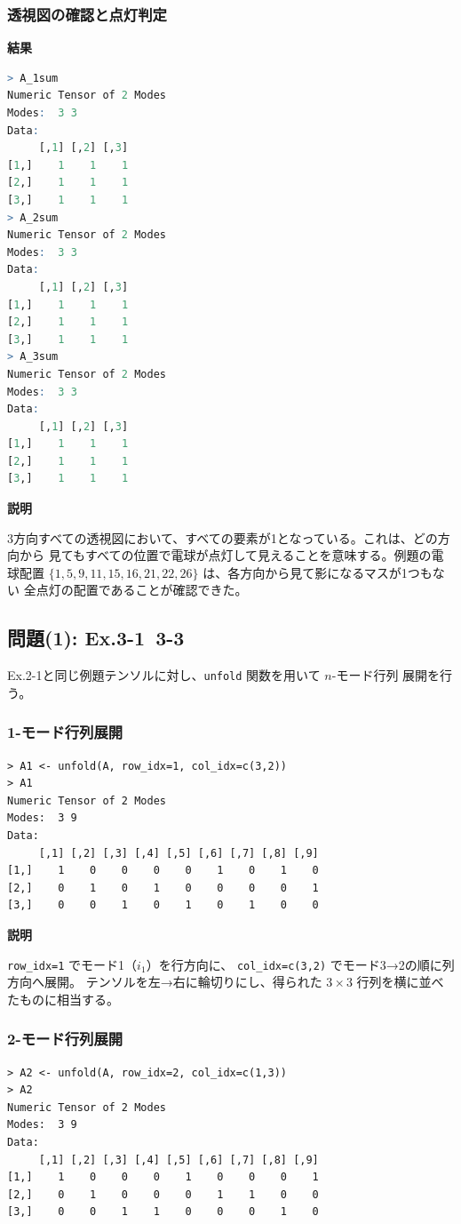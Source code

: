 \documentclass[12pt,a4paper]{ltjsarticle}
\begin{document}
\subsubsection{透視図の確認と点灯判定}

\textbf{結果}

\begin{lstlisting}[language=R]
> A_1sum
Numeric Tensor of 2 Modes
Modes:  3 3
Data:
     [,1] [,2] [,3]
[1,]    1    1    1
[2,]    1    1    1
[3,]    1    1    1
> A_2sum
Numeric Tensor of 2 Modes
Modes:  3 3
Data:
     [,1] [,2] [,3]
[1,]    1    1    1
[2,]    1    1    1
[3,]    1    1    1
> A_3sum
Numeric Tensor of 2 Modes
Modes:  3 3
Data:
     [,1] [,2] [,3]
[1,]    1    1    1
[2,]    1    1    1
[3,]    1    1    1
\end{lstlisting}

\textbf{説明}

3方向すべての透視図において、すべての要素が1となっている。これは、どの方向から
見てもすべての位置で電球が点灯して見えることを意味する。例題の電球配置
$\{1,5,9,11,15,16,21,22,26\}$ は、各方向から見て影になるマスが1つもない
全点灯の配置であることが確認できた。

\subsection{問題(1): Ex.3-1~3-3}\label{subsec:exercise3}

Ex.2-1と同じ例題テンソルに対し、\texttt{unfold} 関数を用いて $n$-モード行列
展開を行う。

\subsubsection{1-モード行列展開}
\begin{lstlisting}
> A1 <- unfold(A, row_idx=1, col_idx=c(3,2))
> A1
Numeric Tensor of 2 Modes
Modes:  3 9
Data:
     [,1] [,2] [,3] [,4] [,5] [,6] [,7] [,8] [,9]
[1,]    1    0    0    0    0    1    0    1    0
[2,]    0    1    0    1    0    0    0    0    1
[3,]    0    0    1    0    1    0    1    0    0
\end{lstlisting}

\textbf{説明}

\texttt{row\_idx=1} でモード1（$i_1$）を行方向に、
\texttt{col\_idx=c(3,2)} でモード3→2の順に列方向へ展開。
テンソルを左→右に輪切りにし、得られた $3\times3$ 行列を横に並べたものに相当する。

\subsubsection{2-モード行列展開}
\begin{lstlisting}
> A2 <- unfold(A, row_idx=2, col_idx=c(1,3))
> A2
Numeric Tensor of 2 Modes
Modes:  3 9
Data:
     [,1] [,2] [,3] [,4] [,5] [,6] [,7] [,8] [,9]
[1,]    1    0    0    0    1    0    0    0    1
[2,]    0    1    0    0    0    1    1    0    0
[3,]    0    0    1    1    0    0    0    1    0
\end{lstlisting}
\end{document}
